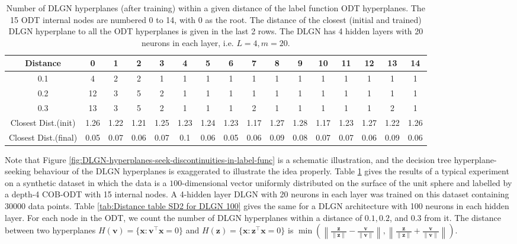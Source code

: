 \documentclass{article} %
\renewcommand{\>}{{\rightarrow}}
\renewcommand{\=}{\stackrel{\triangle}{=}}
\newcommand{\0}{{\mathbf 0}}
\renewcommand{\v}{{\mathbf v}}
\newcommand{\x}{{\mathbf x}}
\newcommand{\z}{{\mathbf z}}
\begin{document}
\begin{table}[h]
\caption{Number of DLGN hyperplanes (after training) within a given distance of the label function ODT hyperplanes. The 15 ODT internal nodes are numbered 0 to 14, with 0 as the root. The distance of the closest (initial and trained) DLGN hyperplane to all the ODT hyperplanes is given in the last 2 rows. The DLGN has 4 hidden layers with 20 neurons in each layer, i.e. $L=4, m=20$.}
\label{tab:Distance table SD2 for DLGN}
\begin{center}
\begin{adjustbox}{width=1 \textwidth}
\begin{tabular}{|c||c|c|c|c|c|c|c|c|c|c|c|c|c|c|c|} 
\hline
Distance & 0 & 1 & 2 & 3 & 4 & 5 & 6 & 7 & 8 & 9 & 10 & 11 & 12 & 13 & 14 \\ \hline
 0.1        &4 &2 &2 &1 &1 &1 &1 &1 &1 &1 &1 &1 &1 &1 &1\\
 0.2        &12 &3 &5 &2 &1 &1 &1 &1 &1 &1 &1 &1 &1 &1 &1\\
 0.3       &13 &3 &5 &2 &1 &1 &1 &2 &1 &1 &1 &1 &1 &2 &1\\ 
 \hline
 \hline
 Closest Dist.(init) &1.26 &1.22 &1.21 &1.25 &1.23 &1.24 &1.23 &1.17 &1.27 &1.28 &1.17 &1.23 &1.27 &1.22 &1.26\\
 Closest Dist.(final) &0.05 &0.07 &0.06 &0.07 &0.1 &0.06 &0.05 &0.06 &0.09 &0.08 &0.07 &0.07 &0.06 &0.09 &0.06\\
 \hline
\end{tabular}
\end{adjustbox}
\end{center}
\end{table}

Note that Figure \ref{fig:DLGN-hyperplanes-seek-discontinuities-in-label-func} is a schematic illustration, and the decision tree hyperplane-seeking behaviour of the DLGN hyperplanes is exaggerated to illustrate the idea properly. Table \ref{tab:Distance table SD2 for DLGN} gives the results of a typical experiment on a synthetic dataset in which the data is a $100$-dimensional vector uniformly distributed on the surface of the unit sphere and labelled by a depth-4 COB-ODT with 15 internal nodes. A 4-hidden layer DLGN with 20 neurons in each layer was trained on this dataset containing  30000 data points. Table \ref{tab:Distance table SD2 for DLGN 100} gives the same for a DLGN architecture with 100 neurons in each hidden layer. For each node in the ODT, we count the number of DLGN hyperplanes within a distance of $0.1, 0.2$, and $0.3$ from it. The distance between two hyperplanes $H(\v)= \{\x:\v^\top\x=0\}$ and $H(\z) = \{\x:\z^\top \x = 0\}$ is $
\min\left( \left\| \frac{\z}{\|\z\|} - \frac{\v}{\|\v\|} \right\| , 
\left\| \frac{\z}{\|\z\|} + \frac{\v}{\|\v\|} \right\| \right).
$
\end{document}
